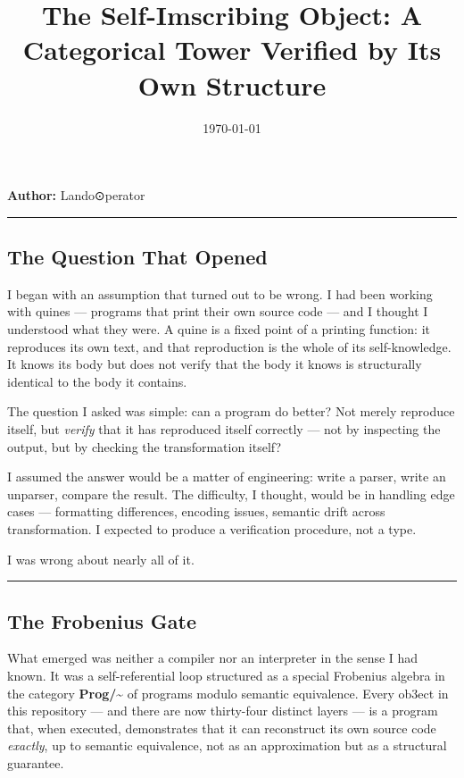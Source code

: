 \documentclass[12pt,a4paper]{article}
\begin{document}
\title{The Self-Imscribing Object: A Categorical Tower Verified by Its Own Structure}
\date{\today}

\maketitle

\textbf{Author:} Lando\otimes⊙perator

\begin{center}
\rule{0.5\textwidth}{0.4pt}
\end{center}

\subsection{The Question That Opened}

I began with an assumption that turned out to be wrong. I had been working with quines --- programs that print their own source code --- and I thought I understood what they were. A quine is a fixed point of a printing function: it reproduces its own text, and that reproduction is the whole of its self-knowledge. It knows its body but does not verify that the body it knows is structurally identical to the body it contains.

The question I asked was simple: can a program do better? Not merely reproduce itself, but \emph{verify} that it has reproduced itself correctly --- not by inspecting the output, but by checking the transformation itself?

I assumed the answer would be a matter of engineering: write a parser, write an unparser, compare the result. The difficulty, I thought, would be in handling edge cases --- formatting differences, encoding issues, semantic drift across transformation. I expected to produce a verification procedure, not a type.

I was wrong about nearly all of it.

\begin{center}
\rule{0.5\textwidth}{0.4pt}
\end{center}

\subsection{The Frobenius Gate}

What emerged was neither a compiler nor an interpreter in the sense I had known. It was a self-referential loop structured as a special Frobenius algebra in the category \textbf{Prog/\textasciitilde{}} of programs modulo semantic equivalence. Every ob3ect in this repository --- and there are now thirty-four distinct layers --- is a program that, when executed, demonstrates that it can reconstruct its own source code \emph{exactly}, up to semantic equivalence, not as an approximation but as a structural guarantee.
\end{document}
